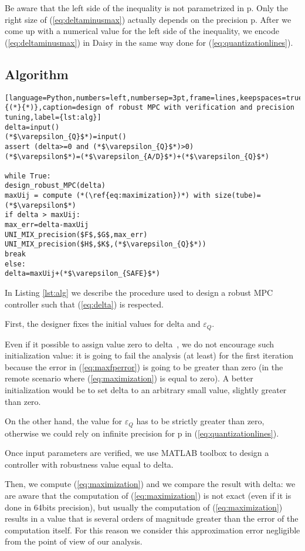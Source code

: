 Be aware that the left side of the inequality is not parametrized in p. Only the right size of (\ref{eq:deltaminusmax}) actually depends on the precision p. After we come up with a numerical value for the left side of the inequality, we encode (\ref{eq:deltaminusmax}) in Daisy in the same way done for (\ref{eq:quantizationlines}).

\subsection{Algorithm}

\begin{lstlisting}[language=Python,numbers=left,numbersep=3pt,frame=lines,keepspaces=true,escapeinside={(*}{*)},caption=design of robust MPC with verification and precision tuning,label={lst:alg}]
delta=input()
(*$\varepsilon_{Q}$*)=input()
assert (delta>=0 and (*$\varepsilon_{Q}$*)>0)
(*$\varepsilon$*)=(*$\varepsilon_{A/D}$*)+(*$\varepsilon_{Q}$*)

while True:
design_robust_MPC(delta)
maxUij = compute (*(\ref{eq:maximization})*) with size(tube)=(*$\varepsilon$*)
if delta > maxUij:
max_err=delta-maxUij
UNI_MIX_precision($F$,$G$,max_err)
UNI_MIX_precision($H$,$K$,(*$\varepsilon_{Q}$*))
break
else:
delta=maxUij+(*$\varepsilon_{SAFE}$*)
\end{lstlisting}
In Listing \ref{lst:alg} we describe the procedure used to design a robust MPC controller such that (\ref{eq:delta}) is respected.

First, the designer fixes the initial values for delta and $\varepsilon_{Q}$.

Even if it possible to assign value zero to delta~\cite{imperialrmpc}, we do not encourage such initialization value: it is going to fail the analysis (at least) for the first iteration because the error in (\ref{eq:maxfperror}) is going to be greater than zero (in the remote scenario where  (\ref{eq:maximization}) is equal to zero). A better initialization would be to set delta to an arbitrary small value, slightly greater than zero.

On the other hand, the value for $\varepsilon_{Q}$ has to be strictly greater than zero, otherwise we could rely on infinite precision for p in (\ref{eq:quantizationlines}).

Once input parameters are verified, we use MATLAB toolbox to design a controller with robustness value equal to delta. 

Then, we compute (\ref{eq:maximization}) and we compare the result with delta: we are aware that the computation of (\ref{eq:maximization}) is not exact (even if it is done in 64bits precision), but usually the computation of (\ref{eq:maximization}) results in a value that is several orders of magnitude greater than the error of the computation itself. For this reason we consider this approximation error negligible from the point of view of our analysis. 

